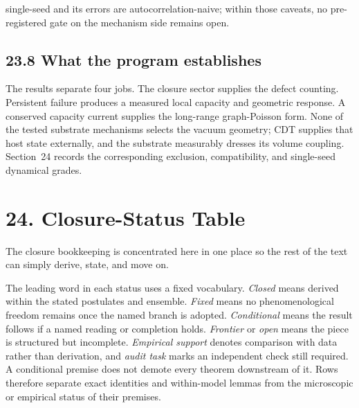 \documentclass[11pt]{article}
\begin{document}
single-seed and its errors are autocorrelation-naive; within those caveats, no pre-registered gate on the mechanism side remains open.

\subsection{23.8 What the program establishes}

The results separate four jobs. The closure sector supplies the defect counting. Persistent failure produces a measured local capacity and geometric response. A conserved capacity current supplies the long-range graph-Poisson form. None of the tested substrate mechanisms selects the vacuum geometry; CDT supplies that host state externally, and the substrate measurably dresses its volume coupling. Section~24 records the corresponding exclusion, compatibility, and single-seed dynamical grades.

\section{24. Closure-Status Table}

The closure bookkeeping is concentrated here in one place so the rest of the text can simply derive, state, and move on.

The leading word in each status uses a fixed vocabulary. \emph{Closed} means derived within the stated postulates and ensemble. \emph{Fixed} means no phenomenological freedom remains once the named branch is adopted. \emph{Conditional} means the result follows if a named reading or completion holds. \emph{Frontier} or \emph{open} means the piece is structured but incomplete. \emph{Empirical support} denotes comparison with data rather than derivation, and \emph{audit task} marks an independent check still required. A conditional premise does not demote every theorem downstream of it. Rows therefore separate exact identities and within-model lemmas from the microscopic or empirical status of their premises.
\end{document}
